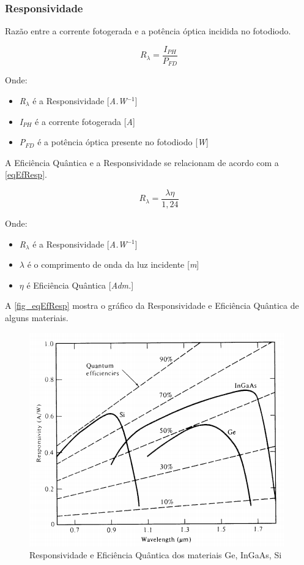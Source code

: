 \subsubsection{Responsividade}
Razão entre a corrente fotogerada e a potência óptica incidida no fotodiodo.

\begin{equation}
    \label{eq_responsividade}
    R_\lambda = \frac{I_{PH}}{P_{FD}}
\end{equation}

Onde:
\begin{itemize}
    \item \textit{R$_\lambda$} \'e a Responsividade [\textit{A.W$^{-1}$}]
    \item \textit{I$_{PH}$} \'e a corrente fotogerada [\textit{A}]
    \item \textit{P$_{FD}$} \'e a potência \'optica presente no fotodiodo [\textit{W}]
\end{itemize}

A Eficiência Quântica e a Responsividade se relacionam de acordo com a \autoref{eqEfResp}.

\begin{equation}
    \label{eqEfResp}
    R_\lambda = \frac{\lambda\eta}{1,24}
\end{equation}

Onde:
\begin{itemize}
    \item \textit{R$_\lambda$} \'e a Responsividade [\textit{A.W$^{-1}$}]
    \item $\lambda$ \'e o comprimento de onda da luz incidente [\textit{m}]
    \item $\eta$ \'e Efici\^encia Qu\^antica [\textit{Adm.}]
\end{itemize}

A \autoref{fig_eqEfResp} mostra o gráfico da Responsividade e Efici\^encia Qu\^antica de alguns materiais.

\begin{figure}[!h]
	\caption{\label{fig_responsividade}Responsividade e Efici\^encia Qu\^antica dos materiais Ge, InGaAs, Si}
	\begin{center}
	    \includegraphics[scale=0.5]{Imagens/GraficoRespostaEspectral.png}
	\end{center}
	\label{fig_eqEfResp}
\end{figure}



